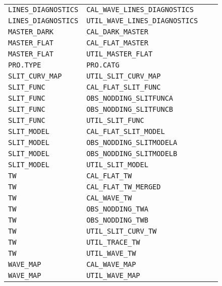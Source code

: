 \begin{tabularx}{\linewidth}{|X|X|X|X|}
\texttt{LINES\_DIAGNOSTICS} & \texttt{CAL\_WAVE\_LINES\_DIAGNOSTICS}  & \\
\texttt{LINES\_DIAGNOSTICS} & \texttt{UTIL\_WAVE\_LINES\_DIAGNOSTICS} & \\
\texttt{MASTER\_DARK      } & \texttt{CAL\_DARK\_MASTER}             & \\
\texttt{MASTER\_FLAT      } & \texttt{CAL\_FLAT\_MASTER}             & \\
\texttt{MASTER\_FLAT      } & \texttt{UTIL\_MASTER\_FLAT}            & \\
\texttt{PRO.TYPE         } & \texttt{PRO.CATG}                    & \\
\texttt{SLIT\_CURV\_MAP    } & \texttt{UTIL\_SLIT\_CURV\_MAP}          & \\
\texttt{SLIT\_FUNC        } & \texttt{CAL\_FLAT\_SLIT\_FUNC}          & \\
\texttt{SLIT\_FUNC        } & \texttt{OBS\_NODDING\_SLITFUNCA}       & \\
\texttt{SLIT\_FUNC        } & \texttt{OBS\_NODDING\_SLITFUNCB}       & \\
\texttt{SLIT\_FUNC        } & \texttt{UTIL\_SLIT\_FUNC}              & \\
\texttt{SLIT\_MODEL       } & \texttt{CAL\_FLAT\_SLIT\_MODEL}         & \\
\texttt{SLIT\_MODEL       } & \texttt{OBS\_NODDING\_SLITMODELA}      & \\
\texttt{SLIT\_MODEL       } & \texttt{OBS\_NODDING\_SLITMODELB}      & \\
\texttt{SLIT\_MODEL       } & \texttt{UTIL\_SLIT\_MODEL}             & \\
\texttt{TW               } & \texttt{CAL\_FLAT\_TW}                 & \\
\texttt{TW               } & \texttt{CAL\_FLAT\_TW\_MERGED}          & \\
\texttt{TW               } & \texttt{CAL\_WAVE\_TW}                 & \\
\texttt{TW               } & \texttt{OBS\_NODDING\_TWA}             & \\
\texttt{TW               } & \texttt{OBS\_NODDING\_TWB}             & \\
\texttt{TW               } & \texttt{UTIL\_SLIT\_CURV\_TW}           & \\
\texttt{TW               } & \texttt{UTIL\_TRACE\_TW}               & \\
\texttt{TW               } & \texttt{UTIL\_WAVE\_TW}                & \\
\texttt{WAVE\_MAP         } & \texttt{CAL\_WAVE\_MAP}                & \\
\texttt{WAVE\_MAP         } & \texttt{UTIL\_WAVE\_MAP}               & \\
\hline
\end{tabularx}
\label{tab:cal-prods}

